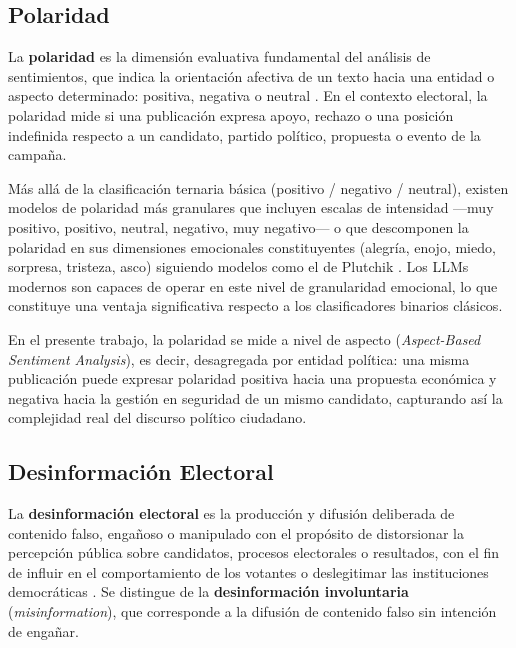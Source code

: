 \documentclass[listof=nochaptergap,12pt,times,authoryear]{report}
\begin{document}
\subsection{Polaridad}
 
La \textbf{polaridad} es la dimensión evaluativa fundamental del análisis de sentimientos, que indica la orientación afectiva de un texto hacia una entidad o aspecto determinado: positiva, negativa o neutral \parencite{mc_liu2012sentiment}. En el contexto electoral, la polaridad mide si una publicación expresa apoyo, rechazo o una posición indefinida respecto a un candidato, partido político, propuesta o evento de la campaña.
 
Más allá de la clasificación ternaria básica (positivo / negativo / neutral), existen modelos de polaridad más granulares que incluyen escalas de intensidad —muy positivo, positivo, neutral, negativo, muy negativo— o que descomponen la polaridad en sus dimensiones emocionales constituyentes (alegría, enojo, miedo, sorpresa, tristeza, asco) siguiendo modelos como el de Plutchik \parencite{mc_plutchik1980emotion}. Los LLMs modernos son capaces de operar en este nivel de granularidad emocional, lo que constituye una ventaja significativa respecto a los clasificadores binarios clásicos.
 
En el presente trabajo, la polaridad se mide a nivel de aspecto (\textit{Aspect-Based Sentiment Analysis}), es decir, desagregada por entidad política: una misma publicación puede expresar polaridad positiva hacia una propuesta económica y negativa hacia la gestión en seguridad de un mismo candidato, capturando así la complejidad real del discurso político ciudadano.
 
\subsection{Desinformación Electoral}
 
La \textbf{desinformación electoral} es la producción y difusión deliberada de contenido falso, engañoso o manipulado con el propósito de distorsionar la percepción pública sobre candidatos, procesos electorales o resultados, con el fin de influir en el comportamiento de los votantes o deslegitimar las instituciones democráticas \parencite{mc_wardle2017information}. Se distingue de la \textbf{desinformación involuntaria} (\textit{misinformation}), que corresponde a la difusión de contenido falso sin intención de engañar.
 
\end{document}
